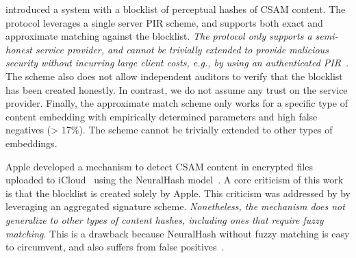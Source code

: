 



 
%
\citet{kulshrestha2021identifying} introduced a system with a
blocklist of perceptual hashes of CSAM content. The protocol leverages a 
single server PIR scheme, and supports both exact and approximate matching 
against the blocklist. \emph{The protocol only
supports a semi-honest service provider, and cannot be trivially
extended to provide malicious security without incurring large client costs,
e.g., by using an authenticated PIR~\cite{colombo2023authpir}}. The
scheme also does not allow independent auditors to verify that the
blocklist has been created honestly. In contrast, we do 
not assume any trust on the service provider. Finally, the approximate match scheme 
only works for a specific type of content embedding with empirically determined parameters and high false negatives (> 17\%). 
The scheme cannot be trivially extended to other types of embeddings. 





%
Apple developed a mechanism to detect CSAM content in encrypted files
uploaded to iCloud~\cite{apple2021csam} using the NeuralHash model~\cite{bhowmick2021apple}. 
A core criticism of this work is that the blocklist is created solely by
Apple. This criticism was addressed by \citet{scheffler2023public} by
leveraging an aggregated signature scheme. \emph{Nonetheless, the mechanism does not generalize to other types of content hashes, including ones that require fuzzy matching}. This is a drawback because NeuralHash without fuzzy matching is easy to circumvent, and also suffers from false positives~\cite{struppek2022learning, neuralHashAttack}. 

